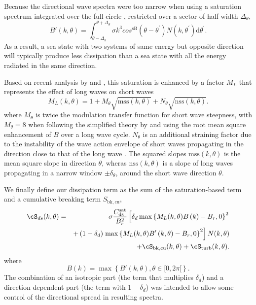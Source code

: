 Because the directional wave spectra were too narrow when using a
saturation spectrum integrated over the full circle \citep{art:AL06},
\citet{art:Aea10} restricted over a sector of half-width $\Delta_\theta$,
\begin{equation}
B'\left(k,\theta\right)=
\int_{\theta-\Delta_\theta}^{\theta+\Delta_\theta} \sigma k^3 cos^{\mathrm{sB}}\left(\theta-
\theta^{\prime}\right) N(k,\theta^{\prime}) \mathrm d
\theta^{\prime} \label{defBofkprime}.
\end{equation}
As a result, a sea state with two systems of same energy but opposite
direction will typically produce less dissipation than a sea state with all
the energy radiated in the same direction.

Based on recent analysis by \cite{Guimaraes2018} and \cite{Peureux&al.2019}, this saturation is enhanced by a factor $M_L$ that represents 
the effect of long waves on short waves 
\begin{equation}
M_L(k,\theta)=1+M_\theta \sqrt{\mathrm{mss}(k,\theta)} + N_\theta \sqrt{\mathrm{nss}(k,\theta)} \label{defFACSAT}.
\end{equation}
where $M_\theta$ is twice the modulation transfer function for short wave steepness, with 
$M_\theta=8$ when following the simplified theory by \cite{art:LHS60} and using the root mean square enhancement of $B$ over a 
long wave cycle. $N_\theta$ is an additional straining factor due to the instability of the wave action envelope of short waves 
propagating in the direction close to that of the long wave \citep{Peureux&al.2019}. The squared slopes $\mathrm{mss}(k,\theta)$ is 
the mean square slope in direction $\theta$, wheras $\mathrm{nss}(k,\theta)$ is a slope of long waves propagating in a narrow window $\pm \delta_\theta$, 
around the short wave direction $\theta$.

We finally define our dissipation term as the sum of the saturation-based term
and a cumulative breaking term $S_{\mathrm{bk,cu}}$,
\begin{eqnarray}
\cS_{ds}(k,\theta)& =&  \sigma
 \frac{C_{\mathrm{ds}}^{\mathrm{sat}}}{B^2_r} \left[ \delta_d
\max\left\{ M_L(k,\theta) B\left(k\right) -
B_r,0\right\}^2 \right.
\nonumber \\
  & & +  \left(1-\delta_d \right) \left. \max\left\{ M_L(k,\theta) B'\left(k,\theta \right)- B_r
 ,0\right\}^2\right]N(k,\theta)  \nonumber \\
 & & + \cS_{\mathrm{bk,cu}}(k,\theta) + \cS_{\mathrm{turb}}(k,\theta) \label{Sds_all}.
\end{eqnarray}
where
\begin{equation}
B\left(k \right)=\max\left\{B'(k,\theta), \theta \in [0,2
\pi[\right\} \label{defBof}.
\end{equation}
The combination of an isotropic part (the term that multiplies $ \delta_d$)
and a direction-dependent part (the term with $1-\delta_d$) was intended to
allow some control of the directional spread in resulting spectra.

